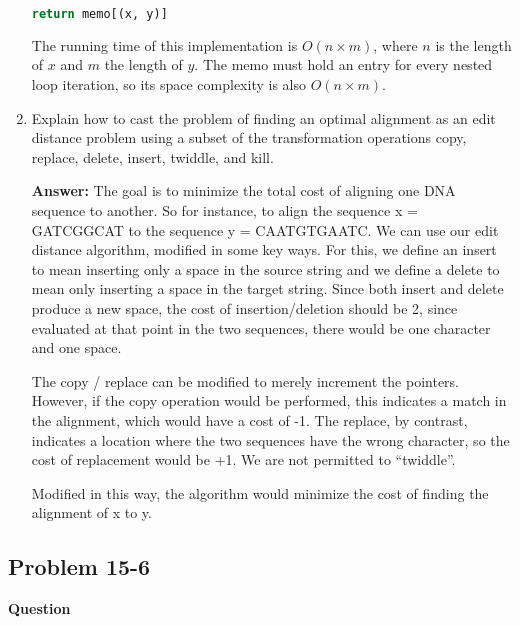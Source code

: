 \documentclass[]{book}
\theoremstyle{definition}
\begin{document}
\begin{enumerate}[label={\alph*.}]
\begin{lstlisting}[language=Python, caption=Edit Distance Bottom-Up Memoization, label=snip:editdistance-bottomup]
    return memo[(x, y)]\end{lstlisting}
        \clearpage

        The running time of this implementation is $O(n \times m)$, where 
        $n$ is the length of $x$ and $m$ the length of $y$.
        The memo must hold an entry for every nested loop iteration, so its
        space complexity is also $O(n \times m)$.

        \item 
            Explain how to cast the problem of finding an optimal alignment as an edit
            distance problem using a subset of the transformation operations copy, replace,
            delete, insert, twiddle, and kill.

        \textbf{Answer:}
            The goal is to minimize the total cost of aligning one DNA sequence
            to another. So for instance, to align the sequence x = GATCGGCAT
            to the sequence y = CAATGTGAATC. We can use our edit
            distance algorithm, modified in some key ways.
            For this, we define an insert to mean inserting only a space
            in the source string and we define a delete to mean only
            inserting a space in the target string. Since both insert
            and delete produce a new space, the cost of insertion/deletion
            should be 2, since evaluated at that point in the two sequences,
            there would be one character and one space.

            The copy / replace can be modified to merely increment
            the pointers. However, if the copy operation would be performed,
            this indicates a match in the alignment, which would have a cost of -1. 
            The replace, by contrast, indicates a location where the two
            sequences have the wrong character, so the cost of replacement would be +1.
            We are not permitted to ``twiddle''. 

            Modified in this way, the algorithm would minimize the cost of finding
            the alignment of x to y.



    \end{enumerate}


\subsection*{Problem 15-6}

\textbf{Question} 
\end{document}

